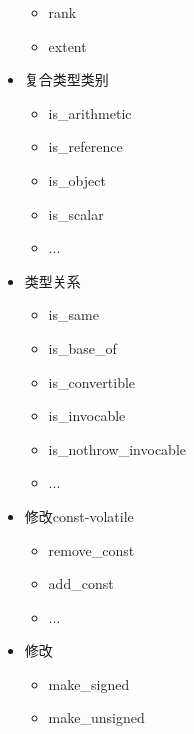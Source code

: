 \begin{itemize}
\begin{itemize}
\item
rank

\item
extent
\end{itemize}

\item
复合类型类别
\begin{itemize}
\item
is\_arithmetic

\item
is\_reference

\item
is\_object

\item
is\_scalar

\item
...
\end{itemize}

\item
类型关系

\begin{itemize}
\item
is\_same

\item
is\_base\_of

\item
is\_convertible

\item
is\_invocable

\item
is\_nothrow\_invocable

\item
...
\end{itemize}

\item
修改const-volatile

\begin{itemize}
\item
remove\_const

\item
add\_const

\item
...
\end{itemize}

\item
修改

\begin{itemize}
\item
make\_signed

\item
make\_unsigned
\end{itemize}


\end{itemize}
